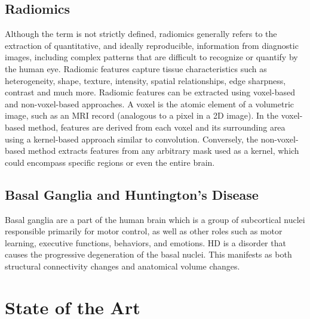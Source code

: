 \subsection{Radiomics}

Although the term is not strictly defined, radiomics generally refers to the extraction of quantitative, and ideally reproducible, information from diagnostic images, including complex patterns that are difficult to recognize or quantify by the human eye. \cite{radio} Radiomic features capture tissue characteristics such as heterogeneity, shape, texture, intensity, spatial relationships, edge sharpness, contrast and much more. \cite{radio2} Radiomic features can be extracted using voxel-based and non-voxel-based approaches. A voxel is the atomic element of a volumetric image, such as an MRI record (analogous to a pixel in a 2D image). In the voxel-based method, features are derived from each voxel and its surrounding area using a kernel-based approach similar to convolution. Conversely, the non-voxel-based method extracts features from any arbitrary mask used as a kernel, which could encompass specific regions or even the entire brain.

\subsection{Basal Ganglia and Huntington’s Disease}

Basal ganglia are a part of the human brain which is a group of subcortical nuclei responsible primarily for motor control, as well as other roles such as motor learning, executive functions, behaviors, and emotions. \cite{basal} \ac{HD} is a disorder that causes the progressive degeneration of the basal nuclei. \cite{hunting} This manifests as both structural connectivity changes and anatomical volume changes. \cite{basal2}\par

\section{State of the Art}
\label{sec:stateoftheart}


